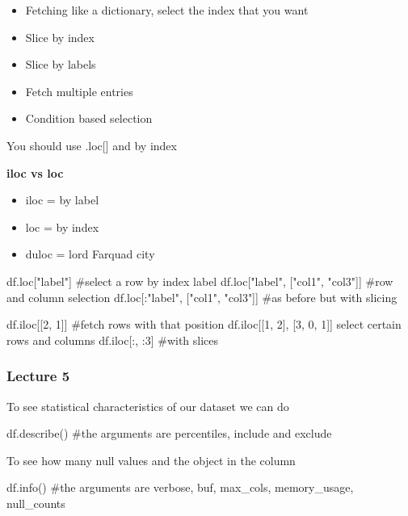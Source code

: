 \begin{itemize}
    \item Fetching like a dictionary, select the index that you want
    \item Slice by index
    \item Slice by labels
    \item Fetch multiple entries
    \item Condition based selection
\end{itemize}

\vspace{10pt}

You should use .loc[] and by index

\vspace{10pt}

\textbf{iloc vs loc}

\begin{itemize}
    \item iloc = by label
    \item loc = by index
    \item duloc = lord Farquad city
\end{itemize}


\begin{pythoncode}
    df.loc["label"] #select a row by index label
    df.loc["label", ["col1", "col3"]] #row and column selection
    df.loc[:"label", ["col1", "col3"]] #as before but with slicing

    df.iloc[[2, 1]] #fetch rows with that position
    df.iloc[[1, 2], [3, 0, 1]] select certain rows and columns
    df.iloc[:, :3] #with slices
\end{pythoncode}

\subsubsection{Lecture 5}

To see statistical characteristics of our dataset we can do

\begin{pythoncode}
    df.describe() #the arguments are percentiles, include and exclude
\end{pythoncode}


To see how many null values and the object in the column

\begin{pythoncode}
    df.info() #the arguments are verbose, buf, max_cols, memory_usage, null_counts
\end{pythoncode}

